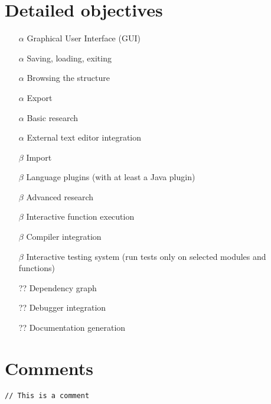 \documentclass{article}
\begin{document}
\section{Detailed objectives}

\begin{itemize}
    \item [$\alpha$] Graphical User Interface (GUI)
    \item [$\alpha$] Saving, loading, exiting
    \item [$\alpha$] Browsing the structure
    \item [$\alpha$] Export
    \item [$\alpha$] Basic research
    \item [$\alpha$] External text editor integration

    \item [$\beta$] Import
    \item [$\beta$] Language plugins (with at least a Java plugin)
    \item [$\beta$] Advanced research
    \item [$\beta$] Interactive function execution
    \item [$\beta$] Compiler integration
    \item [$\beta$] Interactive testing system (run tests only on selected
        modules and functions)

    \item [??] Dependency graph
    \item [??] Debugger integration
    \item [??] Documentation generation
\end{itemize}

\section{Comments}

\texttt{// This is a comment}
\end{document}
